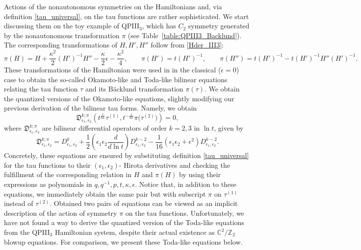 \documentclass[12pt,a4paper]{article}
\numberwithin{equation}{section}
\begin{document}
Actions of the nonautonomous symmetries on the Hamiltonians and, via definition \eqref{tau_universal}, on the tau functions are rather sophisticated. We start discussing them on the toy example of QPIII$_3$, which has $C_2$ symmetry generated by the nonautonomous transformation $\pi$ (see Table~\ref{table:QPIII3_Backlund}). The corresponding transformations of $H, H', H''$ follow from \eqref{Hder_III3}:
\begin{equation}\label{pi_H_III3}
\pi(H)=H+\frac{\kappa^2}2(H')^{-1}H''{-}\frac{\kappa}2\epsilon{-}\frac{\kappa^2}4, \qquad \pi(H')=t(H')^{-1}, \qquad \pi(H'')=t (H')^{-1}-t(H')^{-1}H''(H')^{-1}.
\end{equation}
These transformations of the Hamiltonian were used in \cite[Sec. 2.2]{BS16b} in the classical ($\epsilon=0$) case to obtain the so-called Okamoto-like \cite[(2.14, 2.15)]{BS16b} and Toda-like \cite[(2.24)]{BS16b} bilinear equations relating the tau function $\tau$ and its B\"acklund transformation $\pi(\tau)$. We obtain the quantized versions of the Okamoto-like equations, slightly modifying our previous derivation of the bilinear tau forms. Namely, we obtain
\begin{equation}\label{Okamoto_III3}
\mathfrak{D}^{k;\pi}_{\epsilon_1,\epsilon_2}\left(t^{\frac{\epsilon}{8\kappa}}\tau^{(1)},t^{-\frac{\epsilon}{8\kappa}}\pi\big(\tau^{(2)}\big)\right)=0,  
\end{equation}
where $\mathfrak{D}^{k;\pi}_{\epsilon_1,\epsilon_2}$ are bilinear differential operators of order $k=2,3$ in $\ln t$, given by
\begin{equation}\label{Okamoto_operators_III3}
\mathfrak{D}^{k;\pi}_{\epsilon_1,\epsilon_2}=D^k_{\epsilon_1,\epsilon_2}+\frac12\left(\epsilon_1\epsilon_2\frac{d}{d\ln t}\right)D^{k-2}_{\epsilon_1,\epsilon_2}-\frac1{16}\left(\epsilon_1\epsilon_2{+}\epsilon^2\right)D^{k-2}_{\epsilon_1,\epsilon_2}.
\end{equation}
Concretely, these equations are ensured by substituting definition \eqref{tau_universal} for the tau functions to their $(\epsilon_1,\epsilon_2)$- Hirota derivatives and checking the fulfillment of the corresponding relation in $H$ and $\pi(H)$ by using their expressions as polynomials in $q,q^{-1},p,t,\kappa,\epsilon$. Notice that, in addition to these equations, we immediately obtain the same pair but with subscript $\pi$ on $\tau^{(1)}$ instead of $\tau^{(2)}$. Obtained two pairs of equations can be viewed as an implicit description of the action of symmetry $\pi$ on the tau functions. Unfortunately, we have not found a way to derive the quantized version of the Toda-like equations from the QPIII$_3$ Hamiltonian system, despite their actual existence \cite[Sec. 7]{GMS20} as $\mathbb{C}^2/\mathbb{Z}_2$ blowup equations. For comparison, we present these Toda-like equations below.
\end{document}
